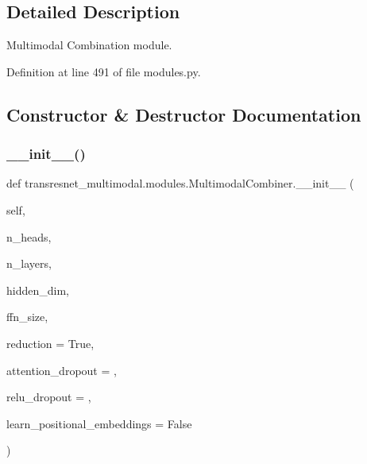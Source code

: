 \subsection{Detailed Description}
\begin{DoxyVerb}Multimodal Combination module.\end{DoxyVerb}
 

Definition at line 491 of file modules.\+py.



\subsection{Constructor \& Destructor Documentation}
\mbox{\label{classtransresnet__multimodal_1_1modules_1_1MultimodalCombiner_a7d29a30f80b0372d0beacd3af1958e65}} 
\subsubsection{\texorpdfstring{\+\_\+\+\_\+init\+\_\+\+\_\+()}{\_\_init\_\_()}}
{\footnotesize\ttfamily def transresnet\+\_\+multimodal.\+modules.\+Multimodal\+Combiner.\+\_\+\+\_\+init\+\_\+\+\_\+ (\begin{DoxyParamCaption}\item[{}]{self,  }\item[{}]{n\+\_\+heads,  }\item[{}]{n\+\_\+layers,  }\item[{}]{hidden\+\_\+dim,  }\item[{}]{ffn\+\_\+size,  }\item[{}]{reduction = {\ttfamily True},  }\item[{}]{attention\+\_\+dropout = {},  }\item[{}]{relu\+\_\+dropout = {},  }\item[{}]{learn\+\_\+positional\+\_\+embeddings = {\ttfamily False} }\end{DoxyParamCaption})}



